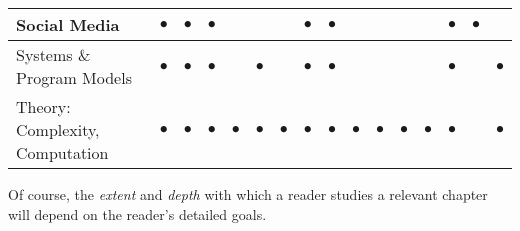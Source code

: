 \begin{tabular}{|l||c|c|c|c|c|c|c|c|c|c|c|c|c|c|c|}
\hline
Social Media 
   & $\bullet$ & $\bullet$ & $\bullet$ &  &  &  & $\bullet$ & $\bullet$ &  &  &  &  & $\bullet$ & $\bullet$ &  \\
\hline
Systems \& Program Models
  & $\bullet$ & $\bullet$ & $\bullet$ &  & $\bullet$ &  & $\bullet$ & $\bullet$ &  &  &  &  & $\bullet$ & & $\bullet$ \\
\hline
Theory: Complexity, Computation
   & $\bullet$ & $\bullet$ & $\bullet$ & $\bullet$ & $\bullet$ & $\bullet$ & $\bullet$ & $\bullet$ & $\bullet$ & $\bullet$ & $\bullet$ & $\bullet$ & $\bullet$ & & $\bullet$ \\
\hline
\end{tabular}

\bigskip

Of course, the {\em extent} and {\em depth} with which a reader studies a relevant chapter will depend on the reader's detailed goals.






